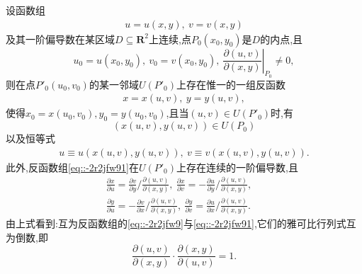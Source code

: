 \documentclass[../../main.tex]{subfiles}%
\begin{document}
\begin{theorem}\label{theorem:反函数组可微定理}
设函数组
\begin{align}\label{eq::-2r2jfw9}
u = u(x,y),\ v = v(x,y)
\end{align}
及其一阶偏导数在某区域$D \subseteq \mathbf{R}^2$上连续,点$P_0(x_0,y_0)$是$D$的内点,且
\[
u_0 = u(x_0,y_0),\ v_0 = v(x_0,y_0),\ \left. \frac{\partial(u,v)}{\partial(x,y)} \right|_{P_0} \neq 0,
\]
则在点$P'_0(u_0,v_0)$的某一邻域$U(P'_0)$上存在惟一的一组反函数
\begin{align}\label{eq::-2r2jfw91}
x = x(u,v),\ y = y(u,v),
\end{align}
使得$x_0 = x(u_0,v_0), y_0 = y(u_0,v_0)$,且当$(u,v) \in U(P'_0)$时,有
\[
(x(u,v),y(u,v)) \in U(P_0)
\]
以及恒等式
\begin{align*}
u \equiv u(x(u,v),y(u,v)),\ v \equiv v(x(u,v),y(u,v)).
\end{align*}
此外,反函数组\eqref{eq::-2r2jfw91}在$U(P'_0)$上存在连续的一阶偏导数,且
\begin{align}
\frac{\partial x}{\partial u} = \frac{\partial v}{\partial y} \bigg/ \frac{\partial(u,v)}{\partial(x,y)},\ \frac{\partial x}{\partial v} = -\frac{\partial u}{\partial y} \bigg/ \frac{\partial(u,v)}{\partial(x,y)},\quad \nonumber \\
\frac{\partial y}{\partial u} = -\frac{\partial v}{\partial x} \bigg/ \frac{\partial(u,v)}{\partial(x,y)},\ \frac{\partial y}{\partial v} = \frac{\partial u}{\partial x} \bigg/ \frac{\partial(u,v)}{\partial(x,y)}. \nonumber
\end{align}
由上式看到:互为反函数组的\eqref{eq::-2r2jfw9}与\eqref{eq::-2r2jfw91},它们的雅可比行列式互为倒数,即
\[
\frac{\partial(u,v)}{\partial(x,y)} \cdot \frac{\partial(x,y)}{\partial(u,v)} = 1.
\]
\end{theorem}
\end{document}
